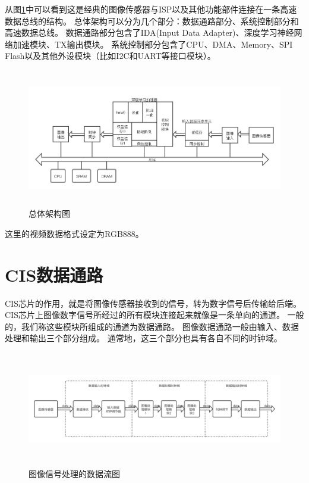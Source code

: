 从图\ref{fig:top_arch}中可以看到这是经典的图像传感器与ISP以及其他功能部件连接在一条高速数据总线的结构。
总体架构可以分为几个部分：数据通路部分、系统控制部分和高速数据总线。
数据通路部分包含了IDA(Input Data Adapter)、深度学习神经网络加速模块、TX输出模块。
系统控制部分包含了CPU、DMA、Memory、SPI Flash以及其他外设模块（比如I2C和UART等接口模块）。
\begin{figure}[htbp]
    \centering
    \includegraphics[width=15cm,height=6cm]{figures/top_arch.png}
    \caption{总体架构图}
    \label{fig:top_arch}
\end{figure}
这里的视频数据格式设定为RGB888。

\section{CIS数据通路}
CIS芯片的作用，就是将图像传感器接收到的信号，转为数字信号后传输给后端。
CIS芯片上图像数字信号所经过的所有模块连接起来就像是一条单向的通道。
一般的，我们称这些模块所组成的通道为数据通路。
图像数据通路一般由输入、数据处理和输出三个部分组成。
通常地，这三个部分也具有各自不同的时钟域。

\begin{figure}[htbp]
    \centering
    \includegraphics[width=15cm,height=5cm]{figures/datapath.png}
    \caption{图像信号处理的数据流图}
    \label{fig:datapath}
\end{figure}

